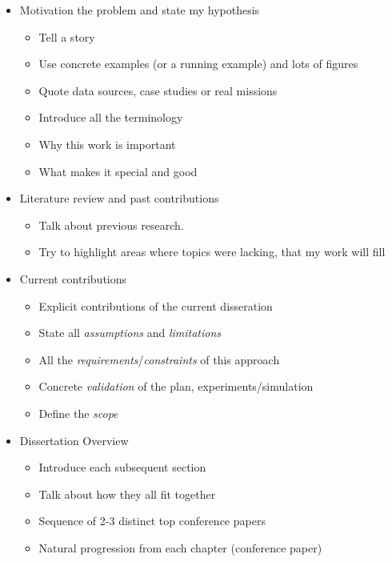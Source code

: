 \begin{itemize}
    \item Motivation the problem and state my hypothesis
        \begin{itemize}
            \item Tell a story
            \item Use concrete examples (or a running example) and lots of figures
            \item Quote data sources, case studies or real missions
            \item Introduce all the terminology
            \item Why this work is important
            \item What makes it special and good
        \end{itemize}
    \item Literature review and past contributions
        \begin{itemize}
            \item Talk about previous research.
            \item Try to highlight areas where topics were lacking, that my work will fill
        \end{itemize}
    \item Current contributions
        \begin{itemize}
            \item Explicit contributions of the current disseration
            \item State all \emph{assumptions} and \emph{limitations}
            \item All the \emph{requirements}/\emph{constraints} of this approach
            \item Concrete \emph{validation} of the plan, experiments/simulation
            \item Define the \emph{scope}
        \end{itemize}
    \item Dissertation Overview
        \begin{itemize}
            \item Introduce each subsequent section
            \item Talk about how they all fit together
            \item Sequence of 2-3 distinct top conference papers
            \item Natural progression from each chapter (conference paper)
        \end{itemize}

        
\end{itemize}

